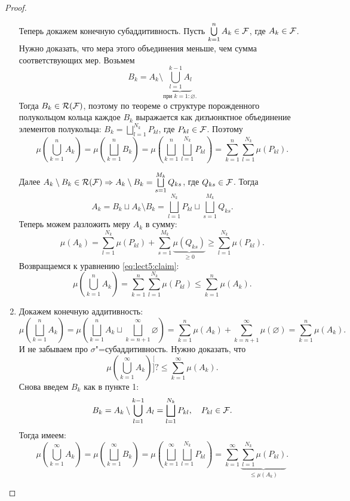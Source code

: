 \begin{claim}
\begin{proof}
\begin{enumerate}
                  Теперь докажем конечную субаддитивность. Пусть $\bigcup\limits_{k=1}^n A_k\in\mathcal{F} $, где $A_k\in\mathcal{F} $.
                  Нужно доказать, что мера этого объединения меньше, чем сумма соответствующих мер. Возьмем
                  \[
                      B_k=A_k\setminus \underbrace{\bigcup_{l=1}^{k-1}A_l}_{\text{при $k=1:\varnothing$.}}
                  \]
                  Тогда $B_k\in\mathcal{R}(\mathcal{F} )$, поэтому по теореме о структуре порожденного полукольцом кольца каждое $B_k$ выражается
                  как дизъюнктное объединение элементов полукольца: $B_k=\bigsqcup\limits_{l=1}^{N_k}P_{kl}$, где $P_{kl}\in\mathcal{F} $.
                  Поэтому
                  \begin{equation}
                      \mu\left(\bigcup_{k=1}^{n}A_k\right)=\mu\left(\bigsqcup_{k=1}^{n}B_k\right)=
                      \mu\left(\bigsqcup_{k=1}^n\bigsqcup_{l=1}^{N_k}P_{kl}\right)=
                      \sum_{k=1}^n\sum_{l=1}^{N_k}\mu(P_{kl}).
                      \label{eq:lect5:claim}
                  \end{equation}

                  Далее $A_k\setminus B_k\in\mathcal{R}(\mathcal{F} )\Rightarrow A_k\setminus B_k=\bigsqcup\limits_{s=1}^{M_k}Q_{ks}$, где $Q_{ks}\in\mathcal{F} $. Тогда
                  \[
                      A_k=B_k\sqcup A_k\setminus B_k=\bigsqcup_{l=1}^{N_k}P_{kl}\sqcup\bigsqcup_{s=1}^{M_k}Q_{ks}.
                  \]
                  Теперь можем разложить меру $A_k$ в сумму:
                  \[
                      \mu(A_k)=\sum_{l=1}^{N_k}\mu(P_{kl})+\sum_{s=1}^{M_k}\underbrace{\mu(Q_{ks})}_{\geqslant 0}\geqslant\sum_{l=1}^{N_k}\mu(P_{kl}).
                  \]
                  Возвращаемся к уравнению \eqref{eq:lect5:claim}:
                  \[
                      \mu\left(\bigcup_{k=1}^{n}A_k\right)=
                      \sum_{k=1}^n\sum_{l=1}^{N_k}\mu(P_{kl})\leqslant
                      \sum_{k=1}^n\mu(A_k).
                  \]

            \item Докажем конечную аддитивность:
                  \[
                      \mu\left(\bigsqcup_{k=1}^n A_k\right)=\mu\left(\bigsqcup_{k=1}^n A_k\sqcup \bigsqcup_{k=n+1}^{\infty}\varnothing\right)=
                      \sum_{k=1}^n\mu(A_k)+\sum_{k=n+1}^{\infty}\mu(\varnothing)=\sum_{k=1}^n\mu(A_k).
                  \]
                  И не забываем про $\sigma$"=субаддитивность. Нужно доказать, что
                  \[
                      \mu\left(\bigcup_{k=1}^{\infty} A_k\right)\stackrel[]{?}{\leqslant}\sum_{k=1}^{\infty}\mu(A_k).
                  \]
                  Снова введем $B_k$ как в пункте 1:
                  \[
                      B_k=A_k\setminus\bigcup_{l=1}^{k-1}A_l=\bigsqcup_{l=1}^{N_k}P_{kl},\quad P_{kl}\in\mathcal{F} .
                  \]
                  Тогда имеем:
                  \[
                      \mu\left(\bigcup_{k=1}^{\infty}A_k\right)=\mu\left(\bigsqcup_{k=1}^{\infty}B_k\right)=\mu\left(\bigsqcup_{k=1}^{\infty}\bigsqcup_{l=1}^{N_k}
                      P_{kl}\right)=\sum_{k=1}^{\infty}\underbrace{\sum_{l=1}^{N_k}\mu(P_{kl})}_{\leqslant\mu(A_k)}.
                  \]
        \end{enumerate}


\end{proof}
\end{claim}
